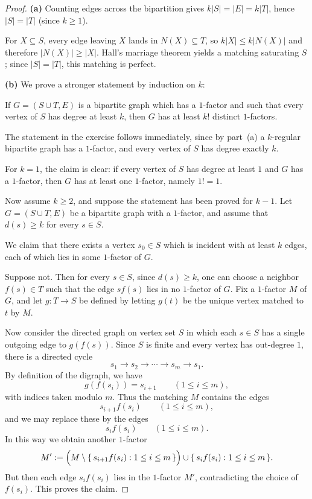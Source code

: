 \documentclass[11pt, a4paper]{ctexrep}
\begin{document}
\begin{proof}
    \noindent\textbf{(a)}
    Counting edges across the bipartition gives $k|S|=|E|=k|T|$, hence $|S|=|T|$ (since $k\ge 1$).

    For $X\subseteq S$, every edge leaving $X$ lands in $N(X)\subseteq T$, so
    $k|X|\le k|N(X)|$ and therefore $|N(X)|\ge |X|$.
    Hall's marriage theorem yields a matching saturating $S$; since $|S|=|T|$, this matching is perfect.

    \noindent\textbf{(b)}
    We prove a stronger statement by induction on $k$:

    \medskip

    \noindent
    If $G=(S\cup T,E)$ is a bipartite graph which has a $1$-factor and such that every
    vertex of $S$ has degree at least $k$, then $G$ has at least $k!$ distinct $1$-factors.

    \medskip

    The statement in the exercise follows immediately, since by part~(a) a $k$-regular
    bipartite graph has a $1$-factor, and every vertex of $S$ has degree exactly $k$.

    For $k=1$, the claim is clear: if every vertex of $S$ has degree at least $1$ and
    $G$ has a $1$-factor, then $G$ has at least one $1$-factor, namely $1!=1$.

    Now assume $k\ge2$, and suppose the statement has been proved for $k-1$.
    Let $G=(S\cup T,E)$ be a bipartite graph with a $1$-factor, and assume that
    $d(s)\ge k$ for every $s\in S$.

    We claim that there exists a vertex $s_0\in S$ which is incident with at least $k$
    edges, each of which lies in some $1$-factor of $G$.

    Suppose not. Then for every $s\in S$, since $d(s)\ge k$, one can choose a neighbor
    $f(s)\in T$ such that the edge $sf(s)$ lies in no $1$-factor of $G$.
    Fix a $1$-factor $M$ of $G$, and let $g:T\to S$ be defined by letting $g(t)$ be the
    unique vertex matched to $t$ by $M$.

    Now consider the directed graph on vertex set $S$ in which each $s\in S$ has a single
    outgoing edge to $g(f(s))$. Since $S$ is finite and every vertex has out-degree $1$,
    there is a directed cycle
    \[
        s_1\to s_2\to \cdots \to s_m\to s_1 .
    \]
    By definition of the digraph, we have
    \[
        g(f(s_i))=s_{i+1}
        \qquad (1\le i\le m),
    \]
    with indices taken modulo $m$. Thus the matching $M$ contains the edges
    \[
        s_{i+1}f(s_i)\qquad (1\le i\le m),
    \]
    and we may replace these by the edges
    \[
        s_if(s_i)\qquad (1\le i\le m).
    \]
    In this way we obtain another $1$-factor
    \[
        M':=\Bigl(M\setminus \{\,s_{i+1}f(s_i):1\le i\le m\,\}\Bigr)
        \cup \{\,s_if(s_i):1\le i\le m\,\}.
    \]
    But then each edge $s_if(s_i)$ lies in the $1$-factor $M'$, contradicting the choice
    of $f(s_i)$. This proves the claim.


\end{proof}
\end{document}
